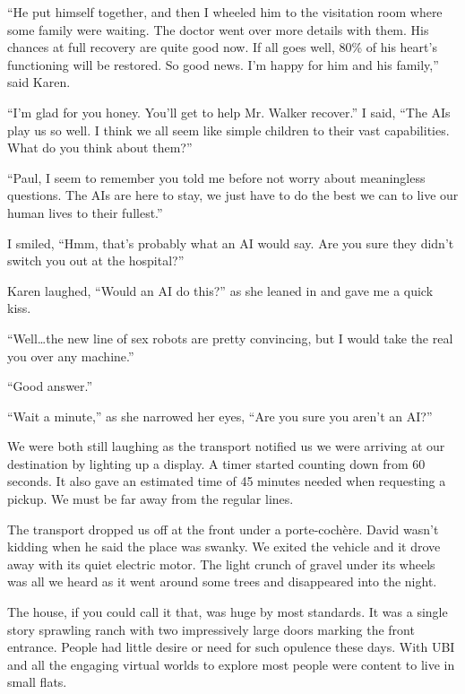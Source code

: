 ``He put himself together, and then I wheeled him to the
visitation room where some family were waiting. The doctor went
over more details with them. His chances at full recovery are
quite good now. If all goes well, 80\% of his heart's
functioning will be restored.  So good news. I'm happy for him
and his family,'' said Karen.

``I'm glad for you honey. You'll get to help Mr. Walker
recover.'' I said, ``The AIs play us so well. I think we all
seem like simple children to their vast capabilities. What do
you think about them?''

``Paul, I seem to remember you told me before not worry about
meaningless questions. The AIs are here to stay, we just have to
do the best we can to live our human lives to their fullest.''

I smiled, ``Hmm, that's probably what an AI
would say. Are you sure they didn't switch you out at the
hospital?''

Karen laughed, ``Would an AI do this?'' as she leaned
in and gave me a quick kiss.

``Well\ldots the new line of sex robots are pretty convincing,
but I would take the real you over any machine.''

``Good answer.''

``Wait a minute,'' as she narrowed her eyes, ``Are you
sure you aren't an AI?''

We were both still laughing as the transport notified us we were
arriving at our destination by lighting up a display. A
timer started counting down from 60 seconds. It also gave an
estimated time of 45 minutes needed when requesting a pickup. We
must be far away from the regular lines.


\subsectsep

The transport dropped us off at the front under a
porte-coch\`ere.  David wasn't kidding when he said the place
was swanky. We exited the vehicle and it drove away with its
quiet electric motor. The light crunch of gravel under its
wheels was all we heard as it went around some trees and
disappeared into the night.

The house, if you could call it that, was huge by most
standards. It was a single story sprawling ranch with two
impressively large doors marking the front entrance.  People had
little desire or need for such opulence these days. With
UBI and all the engaging virtual worlds to explore most
people were content to live in small flats.

